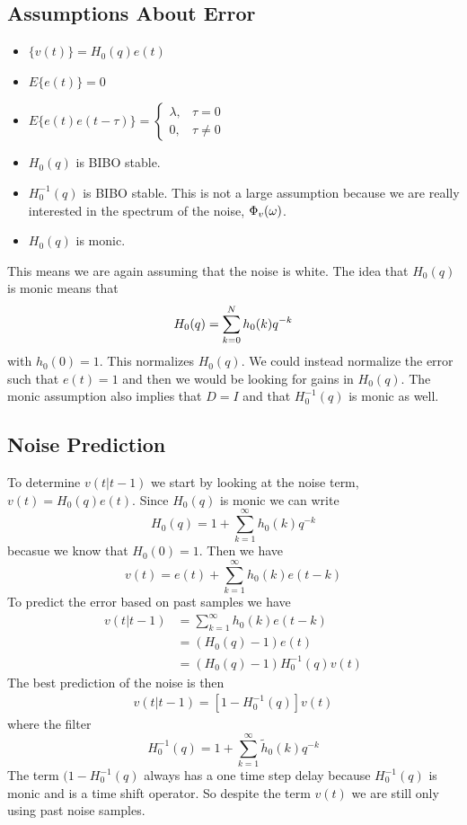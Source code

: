 \documentclass[lecture,12pt,]{pcms-l}
\begin{document}
\subsection{Assumptions About Error}
\begin{itemize}
\item $\{v(t)\} = H_0(q)e(t)$
\item $E\{e(t)\} = 0$
\item $E\{e(t)e(t-\tau)\} = \begin{cases} \lambda, & \tau=0 \\ 0, & \tau\neq0 \end{cases}$
\item $H_0(q)$ is BIBO stable.
\item $H_0^{-1}(q)$ is BIBO stable. This is not a large assumption because we are really interested in the spectrum of the noise, $\Phi_v(\omega)$.
\item $H_0(q)$ is monic.
\end{itemize}
This means we are again assuming that the noise is white. The idea that $H_0(q)$ is monic means that
$$H_0(q)=\sum_{k=0}^N h_0(k)q^{-k}$$
with $h_0(0)=1$. This normalizes $H_0(q)$. We could instead normalize the error such that $e(t)=1$ and then we would be looking for gains in $H_0(q)$. The monic assumption also implies that $D=I$ and that $H_0^{-1}(q)$ is monic as well.

\subsection{Noise Prediction}
To determine $v(t|t-1)$ we start by looking at the noise term, $v(t)=H_0(q)e(t)$. Since $H_0(q)$ is monic we can write
$$H_0(q) = 1 + \sum_{k=1}^\infty h_0(k)q^{-k}$$
becasue we know that $H_0(0) = 1$. Then we have
$$v(t) = e(t) + \sum_{k=1}^\infty h_0(k)e(t-k)$$
To predict the error based on past samples we have
\begin{align*}
v(t|t-1) &= \sum_{k=1}^\infty h_0(k)e(t-k) \\
&= (H_0(q)-1)e(t) \\
&= (H_0(q)-1)H_0^{-1}(q)v(t)
\end{align*}
The best prediction of the noise is then
\begin{align}
\label{eq:noise}
\boxed{v(t|t-1) = [1-H_0^{-1}(q)]v(t)}
\end{align}
where the filter
$$H_0^{-1}(q) = 1+\sum_{k=1}^\infty \tilde{h}_0(k)q^{-k}$$
The term $(1-H_0^{-1}(q)$ always has a one time step delay because $H_0^{-1}(q)$ is monic and is a time shift operator. So despite the term $v(t)$ we are still only using past noise samples.
\end{document}
